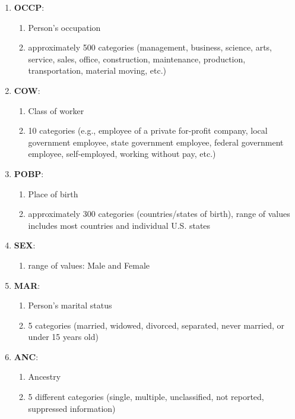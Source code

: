 \begin{enumerate}
  \item \textbf{OCCP}: 
  \begin{enumerate}
    \item Person's occupation
    \item approximately 500 categories (management, business, science, arts, service, sales, office, construction, maintenance, production, transportation, material moving, etc.)
  \end{enumerate}
  
  \item \textbf{COW}: 
    \begin{enumerate}
    \item Class of worker
    \item 10 categories (e.g., employee of a private for-profit company, local government employee, state government employee, federal government employee, self-employed, working without pay, etc.)
  \end{enumerate}
  
  \item \textbf{POBP}:
    \begin{enumerate}
    \item Place of birth
    \item approximately 300 categories (countries/states of birth), range of values includes most countries and individual U.S. states
  \end{enumerate}

    
  \item \textbf{SEX}:
    \begin{enumerate}
    \item range of values: Male and Female
  \end{enumerate}
  
  \item \textbf{MAR}: 
    \begin{enumerate}
    \item Person's marital status
    \item 5 categories (married, widowed, divorced, separated, never married, or under 15 years old)
  \end{enumerate}
  
  \item \textbf{ANC}: 
  \begin{enumerate}
    \item Ancestry
    \item 5 different categories (single, multiple, unclassified, not reported, suppressed information)
  \end{enumerate}


\end{enumerate}
